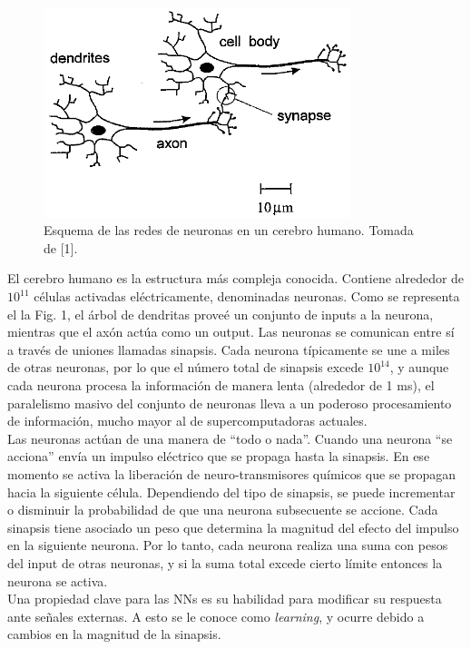 \documentclass{article}
\begin{document}
\begin{figure}[th!]
   \includegraphics[width=0.8\textwidth]{brain.png}
   \caption{Esquema de las redes de neuronas en un cerebro humano. Tomada de [1].}
\end{figure}

El cerebro humano es la estructura más compleja conocida. Contiene alrededor de $10^{11}$ células activadas eléctricamente, denominadas neuronas. Como se representa el la Fig. 1, el árbol de dendritas proveé un conjunto de inputs a la neurona, mientras que el axón actúa como un output. Las neuronas se comunican entre sí a través de uniones llamadas sinapsis. Cada neurona típicamente se une a miles de otras neuronas, por lo que el número total de sinapsis excede $10^{14}$, y aunque cada neurona procesa la información de manera lenta (alrededor de 1 ms), el paralelismo masivo del conjunto de neuronas lleva a un poderoso procesamiento de información, mucho mayor al de supercomputadoras actuales.\\

Las neuronas actúan de una manera de ``todo o nada''. Cuando una neurona ``se acciona'' envía un impulso eléctrico que se propaga hasta la sinapsis. En ese momento se activa la liberación de neuro-transmisores químicos que se propagan hacia la siguiente célula. Dependiendo del tipo de sinapsis, se puede incrementar o disminuir la probabilidad de que una neurona subsecuente se accione. Cada sinapsis tiene asociado un peso que determina la magnitud del efecto del impulso en la siguiente neurona. Por lo tanto, cada neurona realiza una suma con pesos del input de otras neuronas, y si la suma total excede cierto límite entonces la neurona se activa.\\

Una propiedad clave para las NNs es su habilidad para modificar su respuesta ante señales externas. A esto se le conoce como \textit{learning}, y ocurre debido a cambios en la magnitud de la sinapsis.\\
\end{document}
